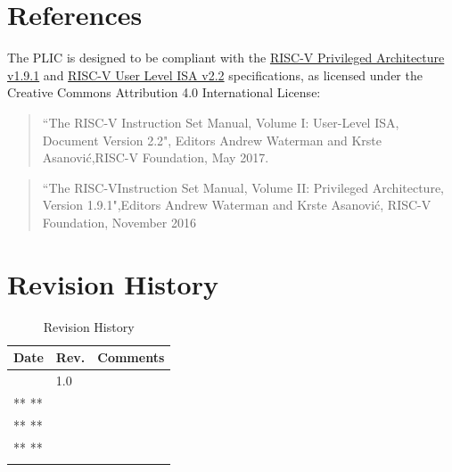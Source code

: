 \documentclass[]{article}
\begin{document}
\section{References}

The PLIC is designed to be compliant with the
\href{https://people.eecs.berkeley.edu/\%7Ekrste/papers/riscv-privileged-v1.9.1.pdf}{RISC-V
Privileged Architecture v1.9.1} and
\href{https://github.com/riscv/riscv-isa-manual/releases/download/riscv-user-2.2/riscv-spec-v2.2.pdf}{RISC-V
User Level ISA v2.2} specifications, as licensed under the Creative
Commons Attribution 4.0 International License:

\begin{quote}
``The RISC-V Instruction Set Manual, Volume I: User-Level ISA, Document
Version 2.2", Editors Andrew Waterman and Krste Asanović,RISC-V
Foundation, May 2017.
\end{quote}

\begin{quote}
``The RISC-VInstruction Set Manual, Volume II: Privileged Architecture,
Version 1.9.1",Editors Andrew Waterman and Krste Asanović, RISC-V
Foundation, November 2016
\end{quote}

\section{Revision History}

\begin{longtable}[]{@{}lll@{}}
\toprule
\textbf{Date} & \textbf{Rev.} & \textbf{Comments}\tabularnewline
\midrule
\endhead
& 1.0 &\tabularnewline
** ** & &\tabularnewline
** ** & &\tabularnewline
** ** & &\tabularnewline
\bottomrule
\caption{Revision History}
\label{tab:REVS}
\end{longtable}
\end{document}
